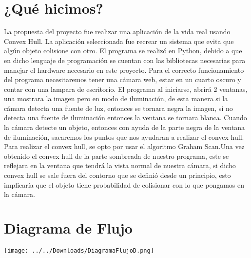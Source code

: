 \documentclass[]{article}
\begin{document}
\section{¿Qué hicimos?}
La propuesta del proyecto fue realizar una aplicación de la vida real usando Convex Hull. La aplicación seleccionada fue recrear un sistema que evita que algún objeto colisione con otro. El programa se realizó en Python, debido a que en dicho lenguaje de programación se cuentan con las bibliotecas necesarias para manejar el hardware necesario en este proyecto. Para el correcto funcionamiento del programa necesitaremos tener una cámara web, estar en un cuarto oscuro y contar con una lampara de escritorio. El programa al iniciarse, abrirá 2 ventanas, una mostrara la imagen pero en modo de iluminación, de esta manera si la cámara detecta una fuente de luz, entonces se tornara negra la imagen, si no detecta una fuente de iluminación entonces la ventana se tornara blanca. Cuando la cámara detecte un objeto, entonces con ayuda de la parte negra de la ventana de iluminación, sacaremos los puntos que nos ayudaran a realizar el convex hull.\\ 
Para realizar el convex hull, se opto por usar el algoritmo Graham Scan.Una vez obtenido el convex hull de la parte sombreada de nuestro programa, este se reflejara en la ventana que tendrá la vista normal de nuestra cámara, si dicho convex hull se sale fuera del contorno que se definió desde un principio, esto implicaría que el objeto tiene probabilidad de colisionar con lo que pongamos en la cámara.

\section{Diagrama de Flujo}
\texttt{[image: ../../Downloads/DiagramaFlujoD.png]}
\end{document}
